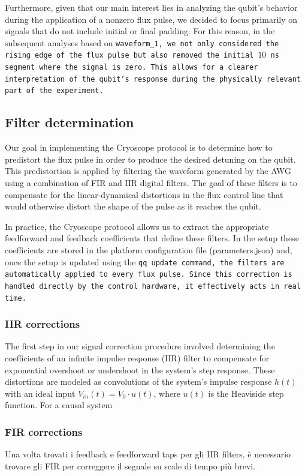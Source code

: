 Furthermore, given that our main interest lies in analyzing the qubit's behavior during the application of a nonzero flux pulse, we decided to focus primarily on signals that do not include initial or final padding.
For this reason, in the subsequent analyses based on \tt{waveform\_1}, we not only considered the rising edge of the flux pulse but also removed the initial $10$ ns segment where the signal is zero. 
This allows for a clearer interpretation of the qubit's response during the physically relevant part of the experiment.

\subsection{Filter determination}
Our goal in implementing the Cryoscope protocol is to determine how to predistort the flux pulse in order to produce the desired detuning on the qubit. 
This predistortion is applied by filtering the waveform generated by the AWG using a combination of FIR and IIR digital filters. 
The goal of these filters is to compensate for the linear-dynamical distortions in the flux control line that would otherwise distort the shape of the pulse as it reaches the qubit.

In practice, the Cryoscope protocol allows us to extract the appropriate feedforward and feedback coefficients that define these filters. 
In the \Qibo setup these coefficients are stored in the platform configuration file (parameters.json) and, once the setup is updated using the \tt{qq update} command, the filters are automatically applied to every flux pulse. 
Since this correction is handled directly by the control hardware, it effectively acts in real time.

\subsubsection{IIR corrections}
The first step in our signal correction procedure involved determining the coefficients of an infinite impulse response (IIR) filter to compensate for exponential overshoot or undershoot in the system’s step response.
These distortions are modeled as convolutions of the system's impulse response $h(t)$ with an ideal input $V_{in}(t) = V_0\cdot u(t)$, where $u(t)$ is the Heaviside step function.
For a causal system 


\subsubsection{FIR corrections}
Una volta trovati i feedback e feedforward taps per gli IIR filters, è necessario trovare gli FIR per correggere il segnale su scale di tempo più brevi. 

